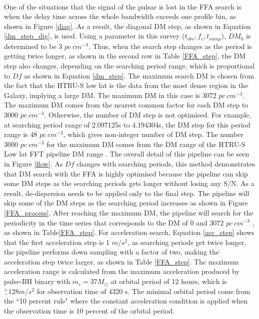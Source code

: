 \documentclass[thesis_msc.tex]{subfiles}
\begin{document}
\paragraph{} One of the situations that the signal of the pulsar is lost in the FFA search is when the delay time across the whole bandwidth exceeds one profile bin, as shown in Figure \ref{diag}. As a result, the diagonal DM step, as shown in Equation \ref{dm_step_dig}, is used. Using a parameter in this survey ($t_{obs},f_c,t_{samp}$), $DM_0$ is determined to be 3 $pc~cm^{-3}$. Thus, when the search step changes as the period is getting twice longer, as shown in the second row in Table \ref{FFA_step}, the DM step also changes, depending on the searching period range, which is proportional to $Df$ as shown in Equation \ref{dm_step}. The maximum search DM is chosen from the fact that the HTRU-S low lat is the data from the most dense region in the Galaxy, implying a large DM. The maximum DM in this case is 3072 $pc~cm^{-3}$. The maximum DM comes from the nearest common factor for each DM step to 3000 $pc~cm^{-3}$. Otherwise, the number of DM step is not optimised. For example, at searching period range of 2.097125s to 4.194304s, the DM step for this period range is 48 $pc~cm^{-3}$, which gives non-integer number of DM step. The number 3000 $pc~cm^{-3}$ for the maximum DM comes from the DM range of the HTRU-S Low lat FFT pipeline DM range \citep{ng2015high}. The overall detail of this pipeline can be seen in Figure \ref{flow}. As $Df$ changes with searching periods, this method demonstrates that DM search with the FFA is highly optimised because the pipeline can skip some DM steps as the searching periods gets longer without losing any S/N. As a result, de-dispersion needs to be applied only to the final step. The pipeline will skip some of the DM steps as the searching period increases as shown in Figure \ref{FFA_process}. After reaching the maximum DM, the pipeline will search for the periodicity in the time series that corresponds to the DM of 0 and 3072 $pc~cm^{-3}$ , as shown in Table\ref{FFA_step}. For acceleration search, Equation \ref{acc_step} shows that the first acceleration step is 1 $m/s^2$, as searching periods get twice longer, the pipeline performs down sampling with a factor of two, making the acceleration step twice larger, as shown in Table \ref{FFA_step}.  The maximum acceleration range is calculated from the maximum acceleration produced by pulse-BH binary with $m_c=37 M_{\odot}$ at orbital period of 12 hours, which is $^+_-128 m/s^2$ for observation time of 4320 s. The minimal orbital period come from the ``10 percent rule" where the constant acceleration condition is applied when the observation time is 10 percent of the orbital period. 
\end{document}

